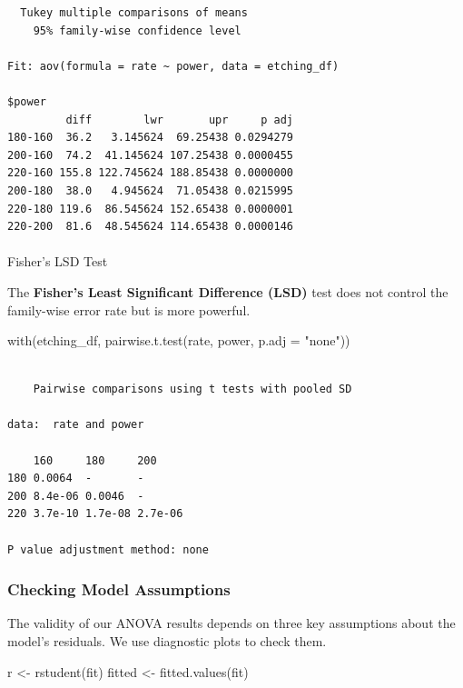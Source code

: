 \documentclass[
  letterpaper,
]{scrbook}
\makeatletter
\let\oldparagraph\paragraph
\renewcommand{\paragraph}{
    \@ifstar
      \xxxParagraphStar
      \xxxParagraphNoStar
  }
\newcommand{\xxxParagraphStar}[1]{\oldparagraph*{#1}\mbox{}}
\newcommand{\xxxParagraphNoStar}[1]{\oldparagraph{#1}\mbox{}}
\newenvironment{Shaded}{\begin{snugshade}}{\end{snugshade}}
\newcommand{\AttributeTok}[1]{\textcolor[rgb]{0.40,0.45,0.13}{#1}}
\newcommand{\FunctionTok}[1]{\textcolor[rgb]{0.28,0.35,0.67}{#1}}
\newcommand{\NormalTok}[1]{\textcolor[rgb]{0.00,0.23,0.31}{#1}}
\newcommand{\OtherTok}[1]{\textcolor[rgb]{0.00,0.23,0.31}{#1}}
\newcommand{\StringTok}[1]{\textcolor[rgb]{0.13,0.47,0.30}{#1}}
\makeatother
\begin{document}
\begin{verbatim}
  Tukey multiple comparisons of means
    95% family-wise confidence level

Fit: aov(formula = rate ~ power, data = etching_df)

$power
         diff        lwr       upr     p adj
180-160  36.2   3.145624  69.25438 0.0294279
200-160  74.2  41.145624 107.25438 0.0000455
220-160 155.8 122.745624 188.85438 0.0000000
200-180  38.0   4.945624  71.05438 0.0215995
220-180 119.6  86.545624 152.65438 0.0000001
220-200  81.6  48.545624 114.65438 0.0000146
\end{verbatim}

\paragraph{Fisher's LSD Test}\label{fishers-lsd-test}

The \textbf{Fisher's Least Significant Difference (LSD)} test does not
control the family-wise error rate but is more powerful.

\begin{Shaded}
\begin{Highlighting}[]
\FunctionTok{with}\NormalTok{(etching\_df, }\FunctionTok{pairwise.t.test}\NormalTok{(rate, power, }\AttributeTok{p.adj =} \StringTok{"none"}\NormalTok{))}
\end{Highlighting}
\end{Shaded}

\begin{verbatim}

    Pairwise comparisons using t tests with pooled SD 

data:  rate and power 

    160     180     200    
180 0.0064  -       -      
200 8.4e-06 0.0046  -      
220 3.7e-10 1.7e-08 2.7e-06

P value adjustment method: none 
\end{verbatim}

\subsubsection{Checking Model
Assumptions}\label{checking-model-assumptions}

The validity of our ANOVA results depends on three key assumptions about
the model's residuals. We use diagnostic plots to check them.

\begin{Shaded}
\begin{Highlighting}[]
\NormalTok{r }\OtherTok{\textless{}{-}} \FunctionTok{rstudent}\NormalTok{(fit)}
\NormalTok{fitted }\OtherTok{\textless{}{-}} \FunctionTok{fitted.values}\NormalTok{(fit)}
\end{Highlighting}
\end{Shaded}
\end{document}
